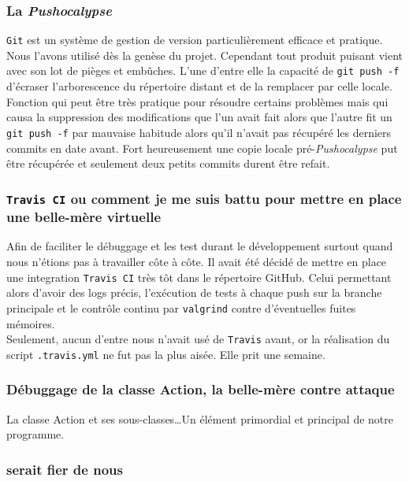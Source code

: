 \documentclass{article}
\newcommand{\info}{\texttt}
\begin{document}
        \subsubsection{La \emph{Pushocalypse}}
        
        \info{Git} est un système de gestion de version particulièrement efficace et pratique. Nous l'avons utilisé dès la genèse du projet. Cependant tout produit puisant vient avec son lot de pièges et embûches. L'une d'entre elle la capacité de \info{git push -f} d'écraser l'arborescence du répertoire distant et de la remplacer par celle locale. Fonction qui peut être très pratique pour résoudre certains problèmes mais qui causa la suppression des modifications que l'un avait fait alors que l'autre fit un \info{git push -f} par mauvaise habitude alors qu'il n'avait pas récupéré les derniers commits en date avant. Fort heureusement une copie locale pré-\emph{Pushocalypse} put être récupérée et seulement deux petits commits durent être refait.
        
        \subsubsection{\info{Travis CI} ou comment je me suis battu pour mettre en place une belle-mère virtuelle}
        
        Afin de faciliter le débuggage et les test durant le développement surtout quand nous n'étions pas à travailler côte à côte. Il avait été décidé de mettre en place une integration \info{Travis CI} très tôt dans le répertoire GitHub. Celui permettant alors d'avoir des logs précis, l'exécution de tests à chaque push sur la branche principale et le contrôle continu par \info{valgrind} contre d'éventuelles fuites mémoires.\\
        Seulement, aucun d'entre nous n'avait usé de \info{Travis} avant, or la réalisation du script \info{.travis.yml} ne fut pas la plus aisée. Elle prit une semaine.
        
        \subsubsection{Débuggage de la classe Action, la belle-mère contre attaque}
        
        La classe Action et ses sous-classes\dots Un élément primordial et principal de notre programme. %
        
        \subsubsection{ serait fier de nous}
        
\end{document}
